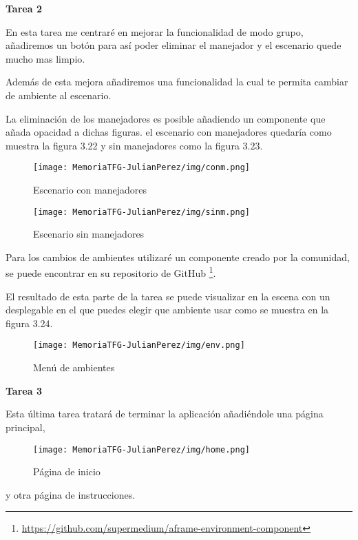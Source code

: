 \documentclass[a4paper, 12pt]{book}
\begin{document}
\textbf{Tarea 2}

En esta tarea me centraré en mejorar la funcionalidad de modo grupo, añadiremos un botón para así poder eliminar el manejador y el escenario quede mucho mas limpio.

Además de esta mejora añadiremos una funcionalidad la cual te permita cambiar de ambiente al escenario.

La eliminación de los manejadores es posible añadiendo un componente que añada opacidad a dichas figuras. el escenario con manejadores quedaría como muestra la figura 3.22 y sin manejadores como la figura 3.23.

\begin{figure}[H]
  \centering
  \begin{minipage}[b]{0.4\textwidth}
 \texttt{[image: MemoriaTFG-JulianPerez/img/conm.png]}
  \caption{Escenario con manejadores}\label{single}
  \end{minipage}
  \hfill
  \begin{minipage}[b]{0.4\textwidth}
  \texttt{[image: MemoriaTFG-JulianPerez/img/sinm.png]}
  \caption{Escenario sin manejadores}\label{scrum}
  \end{minipage}
\end{figure}

Para los cambios de ambientes utilizaré un componente creado por la comunidad, se puede encontrar en su repositorio de GitHub \footnote{\url{https://github.com/supermedium/aframe-environment-component}}. 

El resultado de esta parte de la tarea se puede visualizar en la escena con un desplegable en el que puedes elegir que ambiente usar como se muestra en la figura 3.24.

\begin{figure}[H]
  \centering
  \texttt{[image: MemoriaTFG-JulianPerez/img/env.png]}
  \caption{Menú de ambientes}\label{menu2}
\end{figure}

\textbf{Tarea 3}

Esta última tarea tratará de terminar la aplicación añadiéndole una página principal,

\begin{figure}[H]
  \centering
  \texttt{[image: MemoriaTFG-JulianPerez/img/home.png]}
  \caption{Página de inicio}\label{home}
\end{figure}

y otra página de instrucciones.
\end{document}
